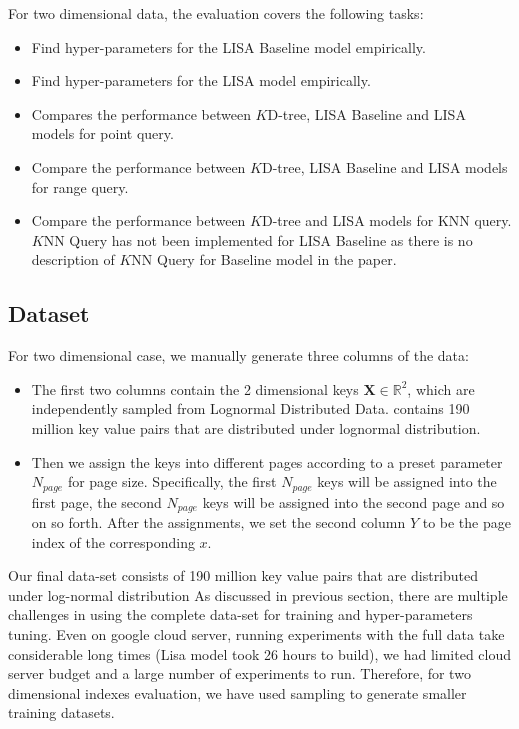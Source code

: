 For two dimensional data, the evaluation covers the following tasks:

\begin{itemize}
 	\item Find hyper-parameters for the LISA Baseline model empirically.
	\item Find hyper-parameters for the LISA model empirically.
	\item Compares the performance between $K$D-tree, LISA Baseline and LISA models for point query.
	\item Compare the performance between $K$D-tree, LISA Baseline and LISA models for range query.
	\item Compare the performance between $K$D-tree and LISA models for KNN query. $K$NN Query has not been implemented for LISA Baseline as there is no description of $K$NN Query for Baseline model in the paper. 
\end{itemize}

\subsection{Dataset}

For two dimensional case, we manually generate three columns of the data:

\begin{itemize}
	\item The first two columns contain the  2 dimensional keys $\boldsymbol{X} \in \mathbb{R}^{2}$, which are independently sampled from Lognormal Distributed Data. 
contains 190 million key value pairs that are distributed under lognormal distribution. %
	\item Then we assign the keys into different pages according to a preset parameter $N_{page}$ for page size. Specifically, the first $N_{page}$ keys will be assigned into the first page, the second $N_{page}$ keys will be assigned into the second page and so on so forth. After the assignments, we set the second column $Y$ to be the page index of the corresponding $x$.
\end{itemize}

Our final data-set consists of 190 million key value pairs that are distributed under log-normal distribution
As discussed in previous section, there are multiple challenges in using  the complete data-set for training and hyper-parameters tuning. Even on google cloud server, running experiments with the full data take considerable long times (Lisa model took 26 hours to build), we had limited cloud server budget and a large number of experiments to run. Therefore, for two dimensional indexes evaluation, we have used sampling to generate smaller training datasets.   


